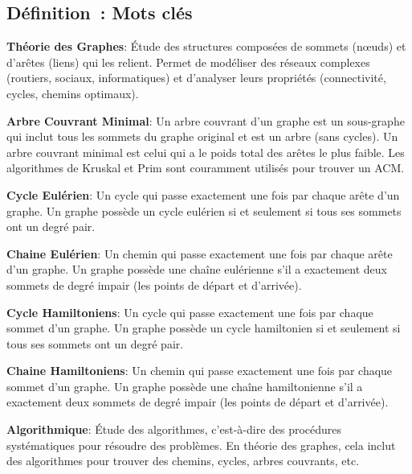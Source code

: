 \subsection*{Définition~: Mots clés}
{}

\noindent \textbf{Théorie des Graphes}: Étude des structures composées de sommets (nœuds) et d'arêtes (liens) qui les relient. Permet de modéliser des réseaux complexes (routiers, sociaux, informatiques) et d'analyser leurs propriétés (connectivité, cycles, chemins optimaux).

\vspace{0.5cm}

\noindent \textbf{Arbre Couvrant Minimal}: Un arbre couvrant d'un graphe est un sous-graphe qui inclut tous les sommets du graphe original et est un arbre (sans cycles). Un arbre couvrant minimal est celui qui a le poids total des arêtes le plus faible. Les algorithmes de Kruskal et Prim sont couramment utilisés pour trouver un ACM.

\vspace{0.5cm}

\noindent \textbf{Cycle Eulérien}: Un cycle qui passe exactement une fois par chaque arête d'un graphe. Un graphe possède un cycle eulérien si et seulement si tous ses sommets ont un degré pair.

\noindent \textbf{Chaine Eulérien}: Un chemin qui passe exactement une fois par chaque arête d'un graphe. Un graphe possède une chaîne eulérienne s'il a exactement deux sommets de degré impair (les points de départ et d'arrivée).

\vspace{0.5cm}

\noindent \textbf{Cycle Hamiltoniens}: Un cycle qui passe exactement une fois par chaque sommet d'un graphe. Un graphe possède un cycle hamiltonien si et seulement si tous ses sommets ont un degré pair.

\noindent \textbf{Chaine Hamiltoniens}: Un chemin qui passe exactement une fois par chaque sommet d'un graphe. Un graphe possède une chaîne hamiltonienne s'il a exactement deux sommets de degré impair (les points de départ et d'arrivée).

\vspace{0.5cm}

\noindent \textbf{Algorithmique}: Étude des algorithmes, c'est-à-dire des procédures systématiques pour résoudre des problèmes. En théorie des graphes, cela inclut des algorithmes pour trouver des chemins, cycles, arbres couvrants, etc.

